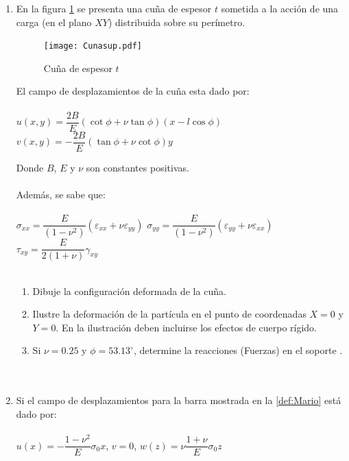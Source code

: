 \documentclass[../notas medios.tex]{subfiles}
\begin{document}
\begin{enumerate}
\newpage

\item  \label{punto09_d} En la figura \cref{cuna} se presenta una cu\~na de espesor $t$ sometida a la acci\'on de una carga (en el plano $XY$) distribuida sobre su per\'imetro.
%
\begin{figure}[H]
	\centering
	{\texttt{[image: Cunasup.pdf]}}\
	\hspace{2 cm}
	\caption{Cu\~na de espesor $t$}
	\label{cuna}
\end{figure}
%
El campo de desplazamientos de la cu\~na  esta dado por:\\\\
%
	\hspace*{10mm} $ u(x,y) = \dfrac{2B}{E} (\cot \phi + \nu \tan \phi) (x - l\cos \phi) $
	\hspace*{10mm} $ v(x,y) = - \dfrac{2B}{E} (\tan \phi + \nu \cot \phi) y$	

\hspace*{10mm} Donde $B$, $E$ y $\nu$ son constantes positivas. \\\\
%
Adem\'as, se sabe que:\\\\
%
 $\sigma_{xx} = \dfrac{E}{(1 - \nu^2)} (\varepsilon_{xx} + \nu \varepsilon_{yy}) $ 
\hspace*{5mm} $\sigma_{yy} = \dfrac{E}{(1 - \nu^2)} (\varepsilon_{yy} + \nu \varepsilon_{xx}) $ 
\hspace*{5mm} $\tau_{xy} = \dfrac{E}{2(1 + \nu)} \gamma_{xy} $\\\\
%
\begin{enumerate}
	\item Dibuje la configuraci\'on deformada de la cu\~na. 
	\item Ilustre la deformaci\'on de la part\'icula en el punto de coordenadas $X = 0$ y $Y = 0$. En la ilustraci\'on deben incluirse los efectos de cuerpo r\'igido. 	
    \item Si $\nu=0.25$ y $\phi=53.13^{\circ}$, determine la reacciones (Fuerzas) en el soporte .\\\\\\
\end{enumerate}

\newpage
%
%
\item  \label{punto10_d} Si el campo de desplazamientos para la barra mostrada en la \ref{def:Mario} est\'a dado por:\\\\
%
	$u\left( x \right) = -\dfrac{1-\nu^2}{E} \sigma_0 x$, \hspace*{10mm} $v=0$, \hspace*{10mm} $w\left( z \right) = \nu \dfrac{1+\nu}{E} \sigma_0 z$


\end{enumerate}
\end{document}
